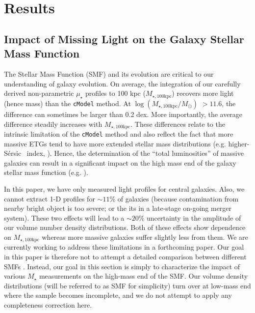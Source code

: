 \documentclass[a4paper,fleqn,usenatbib]{mnras}
\def\ser{{S\'{e}rsic\ }}
\def\mstar{{$M_{\star}$}}
\def\mtot{{$M_{\star,100\mathrm{kpc}}$}}
\def\logmtot{{$\log (M_{\star,100\mathrm{kpc}}/M_{\odot})$}}
\def\m2l{{$M_{\star}/L_{\star}$}}
\def\mden{{$\mu_{\star}$}}
\begin{document}
\section{Results}
    \label{sec:result}

\subsection{Impact of Missing Light on the Galaxy Stellar Mass Function}
    \label{ssec:smf}
    
    The Stellar Mass Function (SMF) and its evolution are critical to our understanding 
    of galaxy evolution. 
    On average, the integration of our carefully derived non-parametric \mden{} profiles 
    to 100 kpc (\mtot{}) recovers more light (hence mass) than the \texttt{cModel} method. 
    At \logmtot{} $>11.6$, the difference can sometimes be larger than 0.2 dex. 
    More importantly, the average difference steadily increases with \mtot{}. 
    These differences relate to the intrinsic limitation of the \texttt{cModel} 
    method and also reflect the fact that more massive ETGs tend to have more 
    extended stellar mass distributions (e.g. higher-\ser{} index, 
    \citealt{Graham2003}). Hence, the determination of the ``total luminosities'' of 
    massive galaxies can result in a significant impact on the high mass end of the 
    galaxy stellar mass function (e.g. \citealt{Bernardi2013, DSouza2014, DSouza2015,
    Bernardi2017}).
    
    
    In this paper, we have only measured light profiles for central galaxies. 
    Also, we cannot extract 1-D profiles for $\sim 11$\% of galaxies (because 
    contamination from nearby bright object is too severe; or the its in a late-stage
    on-going merger system). 
    These two effects will lead to a ${\sim}20$\% uncertainty in the amplitude of 
    our volume number density distributions. 
    Both of these effects show dependence on \mtot{} whereas more massive galaxies 
    suffer slightly less from them.
    We are currently working to address these limitations in a forthcoming paper. 
    Our goal in this paper is therefore not to attempt a detailed comparison between 
    different SMFs \citep[e.g.,][]{Bernardi2013, Bernardi2017}. 
    Instead, our goal in this section is simply to characterize the impact of various 
    \mstar{} measurements on the high-mass end of the SMF.   
    Our volume density distributions (will be referred to as SMF for simplicity) 
    turn over at low-mass end where the sample becomes incomplete, and we do not attempt
    to apply any completeness correction here.  
    
\end{document}
